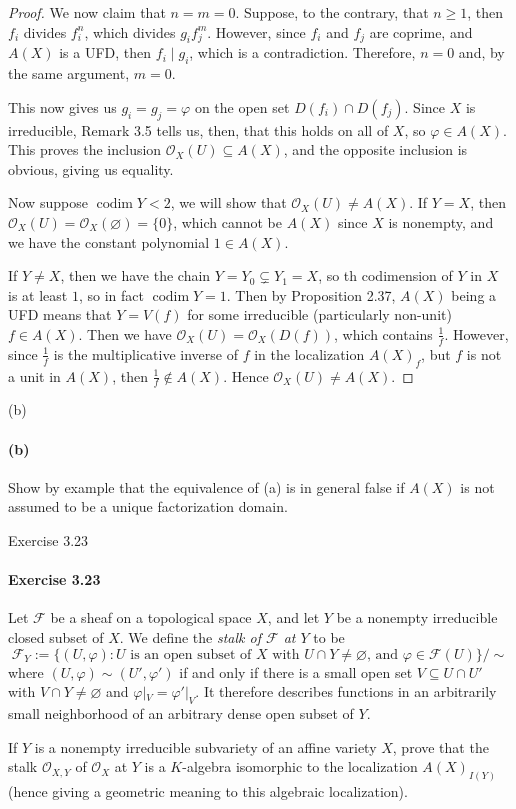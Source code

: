 \documentclass[12pt]{article}
\newenvironment{fullbox}{\begin{lrbox}{\savefullbox}\begin{minipage}{\dimexpr\textwidth-2\fboxsep\relax}}{\end{minipage}\end{lrbox}\begin{center}\framebox[\textwidth]{\usebox{\savefullbox}}\end{center}}
\newenvironment{pbox}[1][]{\begin{fullbox}\ifx#1\empty\else\paragraph{#1}\fi}{\end{fullbox}}
\theoremstyle{definition}
\renewcommand{\phi}{\varphi}
\renewcommand{\emptyset}{\varnothing}
\newcommand{\<}{\langle}
\renewcommand{\>}{\rangle}
\DeclareMathOperator{\codim}{codim}
\renewcommand{\O}{\mathscr{O}}
\newcommand{\F}{\mathscr{F}}
\begin{document}
\begin{proof}
    We now claim that $n = m = 0$. Suppose, to the contrary, that $n \geq 1$, then $f_i$ divides $f_i^n$, which divides  $g_if_j^m$. However, since $f_i$ and $f_j$ are coprime, and $A(X)$ is a UFD, then $f_i \mid g_i$, which is a contradiction. Therefore, $n = 0$ and, by the same argument, $m = 0$.

    This now gives us $g_i = g_j = \phi$ on the open set $D(f_i) \cap D(f_j)$. Since $X$ is irreducible, Remark 3.5 tells us, then, that this holds on all of $X$, so $\phi \in A(X)$. This proves the inclusion $\O_X(U) \subseteq A(X)$, and the opposite inclusion is obvious, giving us equality.

    Now suppose $\codim Y < 2$, we will show that $\O_X(U) \ne A(X)$. If $Y = X$, then $\O_X(U) = \O_X(\emptyset) = \{0\}$, which cannot be $A(X)$ since $X$ is nonempty, and we have the constant polynomial $1 \in A(X)$.
    
    If $Y \ne X$, then we have the chain $Y = Y_0 \subsetneq Y_1 = X$, so th codimension of $Y$ in $X$ is at least $1$, so in fact $\codim Y = 1$. Then by Proposition 2.37, $A(X)$ being a UFD means that $Y = V(f)$ for some irreducible (particularly non-unit) $f \in A(X)$. Then we have $\O_X(U) = \O_X(D(f))$, which contains $\frac{1}{f}$. However, since $\frac{1}{f}$ is the multiplicative inverse of $f$ in the localization $A(X)_f$, but $f$ is not a unit in $A(X)$, then $\frac{1}{f} \notin A(X)$. Hence $\O_X(U) \ne A(X)$.

\end{proof}




\begin{pbox}[(b)]
    Show by example that the equivalence of (a) is in general false if $A(X)$ is not assumed to be a unique factorization domain.
\end{pbox}




\newpage
\begin{pbox}[Exercise 3.23]
    Let $\F$ be a sheaf on a topological space $X$, and let $Y$ be a nonempty irreducible closed subset of $X$. We define the \textit{stalk of $\F$ at $Y$} to be
    \[
        \F_Y := \{(U, \phi) : U \text{ is an open subset of $X$ with $U \cap Y \ne \emptyset$, and $\phi \in \F(U)$} \} / \sim
    \]
    where $(U, \phi) \sim (U', \phi')$ if and only if there is a small open set $V \subseteq U \cap U'$ with $V \cap Y \ne \emptyset$ and $\phi|_V = \phi'|_V$. It therefore describes functions in an arbitrarily small neighborhood of an arbitrary dense open subset of $Y$.

    If $Y$ is a nonempty irreducible subvariety of an affine variety $X$, prove that the stalk $\O_{X, Y}$ of $\O_X$ at $Y$ is a $K$-algebra isomorphic to the localization $A(X)_{I(Y)}$ (hence giving a geometric meaning to this algebraic localization).
\end{pbox}
\end{document}
